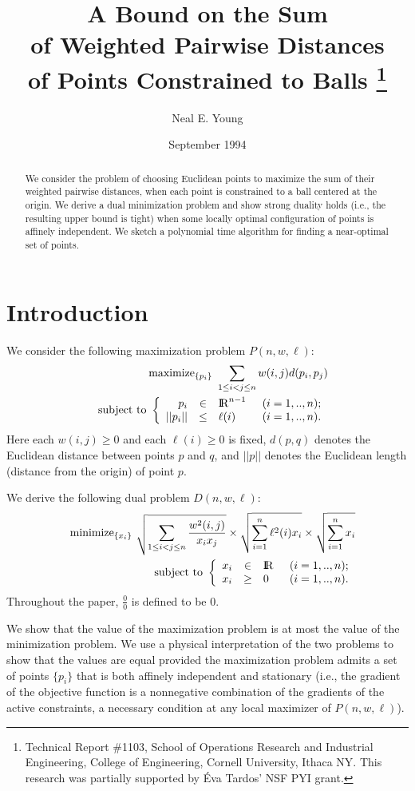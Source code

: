 \documentclass[11pt]{article}
\title{A Bound on the Sum 
  \\ of Weighted Pairwise Distances
  \\ of Points Constrained to Balls
  \thanks{
    Technical Report \#1103,
    School of Operations Research and Industrial Engineering,
    College of Engineering, Cornell University, Ithaca NY.
    This research was partially supported by \'Eva Tardos' NSF PYI grant.}
}
\date{September 1994}
\author{
  Neal E. Young
}
\makeatletter
\newcommand\real{{\rm I\kern-0.2em\rm R}}
\newenvironment{opt}[2]{
\samepage
\renewcommand{\arraystretch}{1.3}
\begin{eqnarray*}
& & \mbox{#1\ } #2 \\
& & \mbox{subject to\ }\left\{ \begin{array}{rcl@{\hspace{0.2in}}l}}{
\end{array}\right.
\end{eqnarray*}
}
\newcommand{\mathfn}[1]{\mathop{\rm #1}\nolimits }
\newcommand{\maximize}{\mathfn{maximize}}
\newcommand{\minimize}{\mathfn{minimize}}
\makeatother
\begin{document}
\maketitle

\begin{abstract}
  We consider the problem of choosing Euclidean points
  to maximize the sum of their weighted pairwise distances,
  when each point is constrained to a ball centered at the origin.
  We derive a dual minimization problem and show strong duality holds
  (i.e., the resulting upper bound is tight)
  when some locally optimal configuration of points is affinely independent.
  We sketch a polynomial time algorithm 
  for finding a near-optimal set of points.
\end{abstract}

\section{Introduction}
We consider the following maximization problem $P(n,w,\ell)$:
\begin{opt}{$\maximize_{\{p_i\}}$}{\sum_{1 \le i < j \le n} w(i,j)d(p_i, p_j)}
  p_i & \in & \real^{n-1}  & (i=1,..,n);
  \\ ||p_i|| & \le & \ell(i)     & (i=1,..,n).
\end{opt}
Here each $w(i,j) \ge 0$ and each $\ell(i) \ge 0$ is fixed, 
$d(p,q)$ denotes the Euclidean distance between points $p$ and $q$,
and $||p||$ denotes the Euclidean length (distance from the origin)
of point $p$.

We derive the following dual problem $D(n,w,\ell)$:
\begin{opt}{$\minimize_{\{x_i\}}$}{
    \sqrt{\sum_{1\le i < j \le n} \frac{w^2(i,j)}{x_i x_j}}
    \times \sqrt{\sum_{i=1}^n \ell^2(i) x_i}
    \times \sqrt{\sum_{i=1}^n x_i}}
  x_i & \in & \real & (i=1,..,n);
  \\ x_i & \ge & 0     & (i=1,..,n).
\end{opt}
Throughout the paper, $\frac{0}{0}$ is defined to be $0$.

We show that the value of the maximization problem
is at most the value of the minimization problem.
We use a physical interpretation of the two problems to show that
the values are equal provided the maximization problem
admits a set of points $\{p_i\}$ that is both affinely independent
and stationary
(i.e., the gradient of the objective function is a nonnegative combination
of the gradients of the active constraints,
a necessary condition at any local maximizer of $P(n,w,\ell)$).
\end{document}
